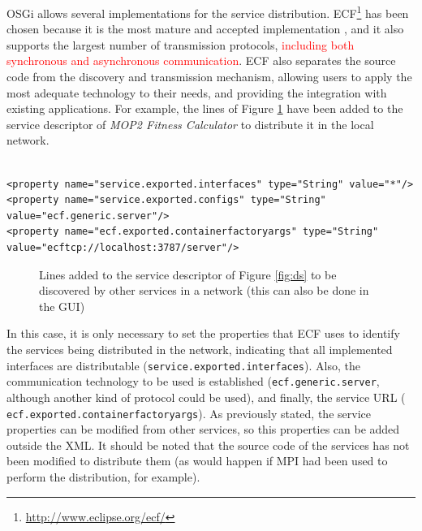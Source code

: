 OSGi allows several implementations for the service distribution. ECF\footnote{\url{http://www.eclipse.org/ecf/}} has been chosen because it is the most mature and accepted implementation \cite{petzold2011dynamic}, and it also supports the largest number of transmission protocols, \textcolor{red}{including both synchronous and asynchronous communication}. ECF also separates the source code from the discovery and transmission mechanism, allowing users to apply the most adequate technology to their needs, and providing the integration with existing applications. For example, the lines of Figure \ref{fig:remote} have been added to the service descriptor of {\em MOP2 Fitness Calculator} to distribute it in the local network.

\newsavebox{\mintedboxServer}
\begin{lrbox}{\mintedboxServer}
\begin{minipage}{10cm}
\begin{verbatim}

<property name="service.exported.interfaces" type="String" value="*"/>
<property name="service.exported.configs" type="String" 
value="ecf.generic.server"/>
<property name="ecf.exported.containerfactoryargs" type="String" 
value="ecftcp://localhost:3787/server"/>
\end{verbatim}
\end{minipage}
\end{lrbox}

\begin{figure}
\usebox{\mintedboxServer}
\caption{Lines added to the service descriptor of Figure \ref{fig:ds} to be discovered by other services in a network  (this can also be done in the GUI)} 
\label{fig:remote} 
\end{figure}

In this case, it is only necessary to set the properties that ECF uses to identify the services being distributed in the network, indicating that all implemented interfaces are distributable (\texttt{ser\-vi\-ce\-.ex\-por\-ted\-.in\-ter\-fa\-ces}). Also, the communication technology to be used is established (\texttt{ecf\-.ge\-ne\-ric\-.ser\-ver}, although another kind of protocol could be used), and finally, the service URL (\texttt{ ecf\-.ex\-por\-ted\-.con\-tai\-ner\-fac\-to\-ry\-args}). As previously stated, the service properties can be modified from other services, so this properties can be added outside the XML. It should be noted that the source code of the services has not been modified to distribute them (as would happen if MPI had been used to perform the distribution, for example).




